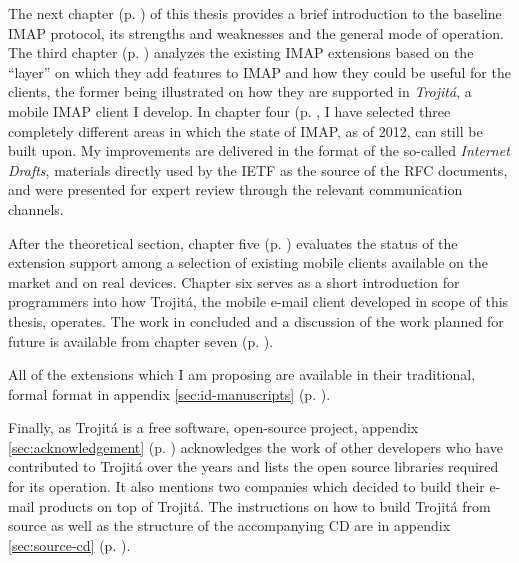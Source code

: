 \documentclass[trojita]{subfiles}
\begin{document}
The next chapter (p. \pageref{sec:imap-protocol}) of this thesis provides a brief introduction to the baseline IMAP
protocol, its strengths and weaknesses and the general mode of operation.  The third chapter (p.
\pageref{sec:imap-extensions}) analyzes the existing IMAP extensions based on the ``layer'' on which they add features
to IMAP and how they could be useful for the clients, the former being illustrated on how they are supported in {\em
Trojitá}, a mobile IMAP client I develop.  In chapter four (p.  \pageref{sec:proposed-extensions}, I have selected three
completely different areas in which the state of IMAP, as of 2012, can still be built upon.  My improvements are
delivered in the format of the so-called {\em Internet Drafts}, materials directly used by the IETF as the source of the
RFC documents, and were presented for expert review through the relevant communication channels.

After the theoretical section, chapter five (p. \pageref{sec:mobile-imap}) evaluates the status of the extension support
among a selection of existing mobile clients available on the market and on real devices.  Chapter six serves as a
short introduction for programmers into how Trojitá, the mobile e-mail client developed in scope of this thesis,
operates.  The work in concluded and a discussion of the work planned for future is available from chapter seven (p.
\pageref{sec:conclusion}).

All of the extensions which I am proposing are available in their traditional, formal format in appendix \ref{sec:id-manuscripts}
(p. \pageref{sec:id-manuscripts}).

Finally, as Trojitá is a free software, open-source project, appendix \ref{sec:acknowledgement} (p.
\pageref{sec:acknowledgement}) acknowledges the work of other developers who have contributed to Trojitá over the years
and lists the open source libraries required for its operation.  It also mentions two companies which decided to build
their e-mail products on top of Trojitá.  The instructions on how to build Trojitá from source as well as the structure
of the accompanying CD are in appendix \ref{sec:source-cd} (p. \pageref{sec:source-cd}).
\end{document}
